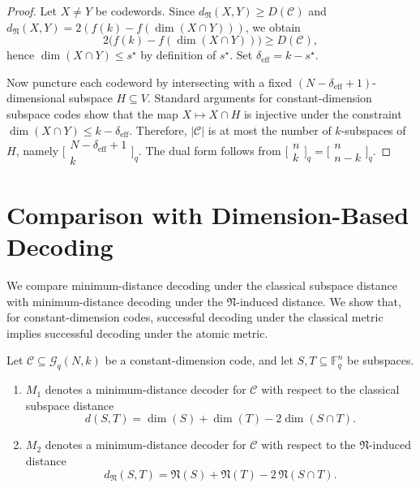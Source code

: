\documentclass{svproc}
\begin{document}
\begin{proof}
Let $X\neq Y$ be codewords. Since $d_{\mathfrak N}(X,Y)\ge D(\mathcal C)$ and
$d_{\mathfrak N}(X,Y)=2(f(k)-f(\dim(X\cap Y)))$, we obtain
\[
2\bigl(f(k)-f(\dim(X\cap Y))\bigr)\ge D(\mathcal C),
\]
hence $\dim(X\cap Y)\le s^\star$ by definition of $s^\star$. Set
$\delta_{\mathrm{eff}}=k-s^\star$.

Now puncture each codeword by intersecting with a fixed $(N-\delta_{\mathrm{eff}}+1)$-dimensional
subspace $H\subseteq V$. Standard arguments for constant-dimension subspace codes
show that the map $X\mapsto X\cap H$ is injective under the constraint
$\dim(X\cap Y)\le k-\delta_{\mathrm{eff}}$.
Therefore, $|\mathcal C|$ is at most the number of $k$-subspaces of $H$, namely
$\bigl[\!\!\begin{smallmatrix}N-\delta_{\mathrm{eff}}+1\\ k\end{smallmatrix}\!\!\bigr]_q$.
The dual form follows from $\bigl[\!\!\begin{smallmatrix}n\\k\end{smallmatrix}\!\!\bigr]_q
=\bigl[\!\!\begin{smallmatrix}n\\n-k\end{smallmatrix}\!\!\bigr]_q$.
\end{proof}

\section{Comparison with Dimension-Based Decoding}\label{sec:comparison}


We compare minimum-distance decoding under the classical subspace distance with
minimum-distance decoding under the $\mathfrak N$-induced distance. We show that,
for constant-dimension codes, successful decoding under the classical metric
implies successful decoding under the atomic metric.
\begin{definition}
Let $\mathcal C \subseteq \mathcal G_q(N,k)$ be a constant-dimension code, and
let $S,T \subseteq \mathbb F_q^n$ be subspaces.
\begin{enumerate}
\item $M_1$ denotes a minimum-distance decoder for $\mathcal C$ with respect to
the classical subspace distance
\[
d(S,T)=\dim(S)+\dim(T)-2\dim(S\cap T).
\]

\item $M_2$ denotes a minimum-distance decoder for $\mathcal C$ with respect to
the $\mathfrak N$-induced distance
\[
d_{\mathfrak N}(S,T)=\mathfrak N(S)+\mathfrak N(T)-2\,\mathfrak N(S\cap T).
\]
\end{enumerate}
\end{definition}
\end{document}
